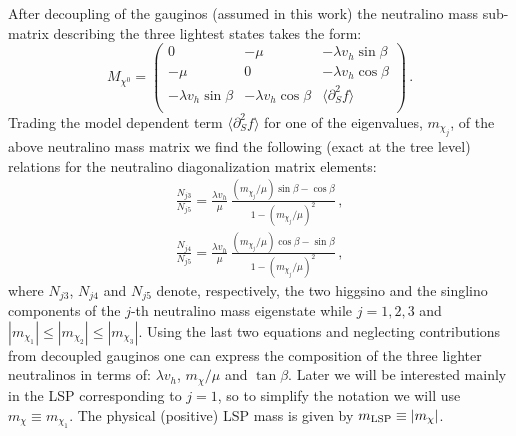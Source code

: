 \documentclass[12pt,twoside]{article}
\begin{document}
After decoupling of the gauginos (assumed in this work) 
the neutralino mass sub-matrix describing the three lightest
states takes the form:
%
\begin{equation}
\label{M_chi}
 {M_{\chi^0}}=
\left(
\begin{array}{ccc}
  0 & -\mu & -\lambda v_h \sin\beta \\[4pt]
  -\mu & 0 & -\lambda v_h \cos\beta \\[4pt]
  -\lambda v_h \sin\beta & -\lambda v_h \cos\beta 
& \langle\partial_S^2f\rangle \\
\end{array}
\right) \,.
\end{equation}
%
Trading the model dependent term $\langle\partial_S^2f\rangle$
for one of the eigenvalues, $m_{\chi_j}$, of the above neutralino mass
matrix we find the following (exact at the tree level) relations 
for the neutralino diagonalization matrix 
elements:
%
\begin{align}
\label{Nj3Nj5}
\frac{N_{j3}}{N_{j5}}
=
\frac{\lambda v_h}{\mu}
\,
\frac{(m_{\chi_j}/\mu)\sin\beta-\cos\beta}
{1-\left(m_{\chi_j}/\mu\right)^2}
\,,\\[4pt]
\label{Nj4Nj5}
\frac{N_{j4}}{N_{j5}}
=
\frac{\lambda v_h}{\mu}
\,
\frac{(m_{\chi_j}/\mu)\cos\beta-\sin\beta}
{1-\left(m_{\chi_j}/\mu\right)^2}
\,,
\end{align}
%
where $N_{j3}$, $N_{j4}$ and $N_{j5}$ denote, respectively, the two higgsino 
and the singlino components of the $j$-th neutralino mass eigenstate
while $j=1,2,3$ and $|m_{\chi_1}|\le|m_{\chi_2}|\le|m_{\chi_3}|$.
Using the last two equations and neglecting contributions from decoupled 
gauginos one can express the composition of the three lighter neutralinos 
in terms of: $\lambda v_h$, $m_\chi/\mu$ and $\tan\beta$.
Later we will be interested mainly in the LSP corresponding to $j=1$, 
so to simplify the notation we will use $m_{\chi}\equiv m_{\chi_1}$. 
The physical (positive) LSP mass is given by $m_{\rm LSP}\equiv|m_{\chi}|$.
\end{document}
